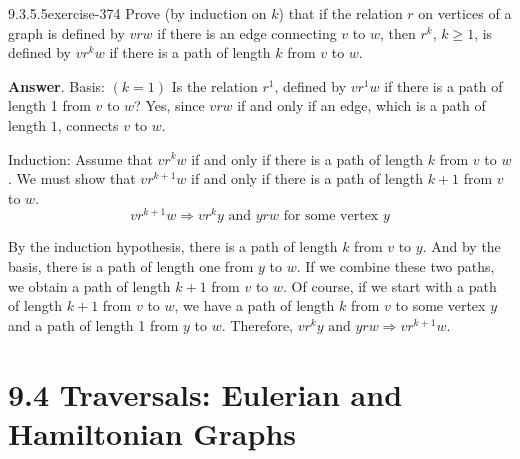 \documentclass[twoside,10pt,]{book}
\numberwithin{equation}{section}
\begin{document}
\begin{divisionsolution}{9.3.5.5}{}{exercise-374}%
\hypertarget{p-3222}{}%
Prove (by induction on \(k\)) that if the relation \(r\) on vertices of a graph is defined by \(v r w\) if there is an edge connecting \(v\) to \(w\), then \(r^k\), \(k \geq  1\), is defined by \(v r^kw\) if there is a path of length \(k\) from \(v\) to \(w\).%
\par\smallskip%
\noindent\textbf{Answer}.\quad%
\hypertarget{p-3223}{}%
Basis: \((k=1)\) Is the relation \(r^1\), defined by \(v r^1 w\) if there is a path of length 1 from \(v \text{ to } w\)? Yes, since \(v r w\) if and only if an edge, which is a path of length \(1\), connects \(v\) to \(w\).%
\par
\hypertarget{p-3224}{}%
Induction: Assume that \(v r^k w\) if and only if there is a path of length \(k\) from \(v\) to \(w\). We must show that \(v r^{k+1} w\) if and only if there is a path of length \(k+1\) from \(v\) to \(w\).%
\begin{equation*}
v r^{k+1} w \Rightarrow v r^k y \textrm{ and } y r w\textrm{ for some vertex } y
\end{equation*}
%
\par
\hypertarget{p-3225}{}%
By the induction hypothesis, there is a path of length \(k\) from \(v \textrm{ to } y\). And by the basis, there is a path of length one from \(y\) to \(w\). If we combine these two paths, we obtain a path of length \(k+1\) from \(v\) to \(w\). Of course, if we start with a path of length \(k+1\) from \(v\) to \(w\), we have a path of length \(k\) from \(v\) to some vertex \(y\) and a path of length 1 from \(y\) to \(w\). Therefore, \(v r^k y \textrm{ and } y r w \Rightarrow  v r^{k+1} w\).%
\end{divisionsolution}%
\section*{9.4 Traversals: Eulerian and Hamiltonian Graphs}
\end{document}
